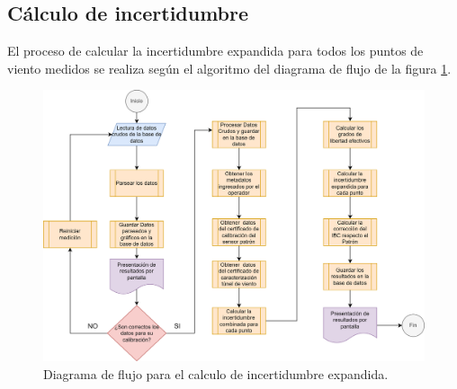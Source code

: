 \subsection{Cálculo de incertidumbre}\label{sec:calculoIncertidumbre}

El proceso de calcular la incertidumbre expandida \cite{GUM} para todos los puntos de viento medidos se realiza  según el algoritmo del diagrama de flujo de la figura \ref{fig:DiagramaFlujoCalculoIncertidumbre}.

\begin{figure}[H]
    \centering
    \includegraphics[width=1\linewidth]{Figuras/AplicacionWeb/backend/DiagramaFlujoCalculoIncertidumbre.png}
    \caption{Diagrama de flujo para el calculo de incertidumbre expandida.}
    \label{fig:DiagramaFlujoCalculoIncertidumbre}
\end{figure}

